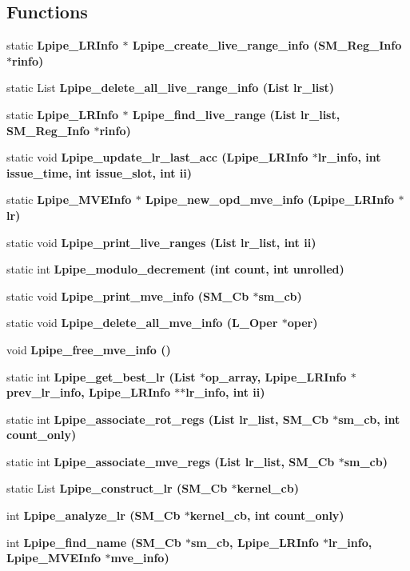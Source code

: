 \subsection*{Functions}
\begin{CompactItemize}
\item 
static \bf{Lpipe\_\-LRInfo} $\ast$ \bf{Lpipe\_\-create\_\-live\_\-range\_\-info} (\bf{SM\_\-Reg\_\-Info} $\ast$rinfo)
\item 
static List \bf{Lpipe\_\-delete\_\-all\_\-live\_\-range\_\-info} (List lr\_\-list)
\item 
static \bf{Lpipe\_\-LRInfo} $\ast$ \bf{Lpipe\_\-find\_\-live\_\-range} (List lr\_\-list, \bf{SM\_\-Reg\_\-Info} $\ast$rinfo)
\item 
static void \bf{Lpipe\_\-update\_\-lr\_\-last\_\-acc} (\bf{Lpipe\_\-LRInfo} $\ast$lr\_\-info, int issue\_\-time, int issue\_\-slot, int ii)
\item 
static \bf{Lpipe\_\-MVEInfo} $\ast$ \bf{Lpipe\_\-new\_\-opd\_\-mve\_\-info} (\bf{Lpipe\_\-LRInfo} $\ast$lr)
\item 
static void \bf{Lpipe\_\-print\_\-live\_\-ranges} (List lr\_\-list, int ii)
\item 
static int \bf{Lpipe\_\-modulo\_\-decrement} (int count, int unrolled)
\item 
static void \bf{Lpipe\_\-print\_\-mve\_\-info} (\bf{SM\_\-Cb} $\ast$sm\_\-cb)
\item 
static void \bf{Lpipe\_\-delete\_\-all\_\-mve\_\-info} (L\_\-Oper $\ast$oper)
\item 
void \bf{Lpipe\_\-free\_\-mve\_\-info} ()
\item 
static int \bf{Lpipe\_\-get\_\-best\_\-lr} (List $\ast$op\_\-array, \bf{Lpipe\_\-LRInfo} $\ast$prev\_\-lr\_\-info, \bf{Lpipe\_\-LRInfo} $\ast$$\ast$lr\_\-info, int ii)
\item 
static int \bf{Lpipe\_\-associate\_\-rot\_\-regs} (List lr\_\-list, \bf{SM\_\-Cb} $\ast$sm\_\-cb, int count\_\-only)
\item 
static int \bf{Lpipe\_\-associate\_\-mve\_\-regs} (List lr\_\-list, \bf{SM\_\-Cb} $\ast$sm\_\-cb)
\item 
static List \bf{Lpipe\_\-construct\_\-lr} (\bf{SM\_\-Cb} $\ast$kernel\_\-cb)
\item 
int \bf{Lpipe\_\-analyze\_\-lr} (\bf{SM\_\-Cb} $\ast$kernel\_\-cb, int count\_\-only)
\item 
int \bf{Lpipe\_\-find\_\-name} (\bf{SM\_\-Cb} $\ast$sm\_\-cb, \bf{Lpipe\_\-LRInfo} $\ast$lr\_\-info, \bf{Lpipe\_\-MVEInfo} $\ast$mve\_\-info)
$$
\end{CompactItemize}
